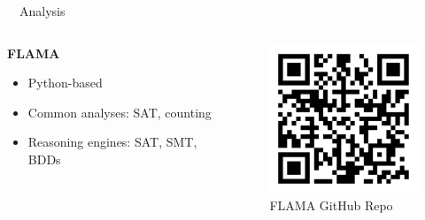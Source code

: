 \documentclass[
	aspectratio=169, %
	8pt, %
	nosectionframes, %
]{beamer}
\newcommand{\inlinesubtitle}[1]{\textcolor{gray!60}{~{}~#1}}
\begin{document}
\begin{frame}{\insertsection \inlinesubtitle{Analysis}}
    \vspace{0.4cm}
    \begin{columns}[t]
		\begin{column}{0.49\textwidth}
			\textbf{FLAMA}
            \begin{itemize}
                \item Python-based
                \item Common analyses: SAT, counting
                \item Reasoning engines: SAT, SMT, BDDs
            \end{itemize}
		\end{column}%
		\begin{column}{0.49\textwidth}
           \begin{figure}
                \centering
                \includegraphics[width=5cm]{pics/qr/flama.pdf}
                \caption{FLAMA GitHub Repo}
            \end{figure}
		\end{column}
	\end{columns}
\end{frame}
\end{document}
